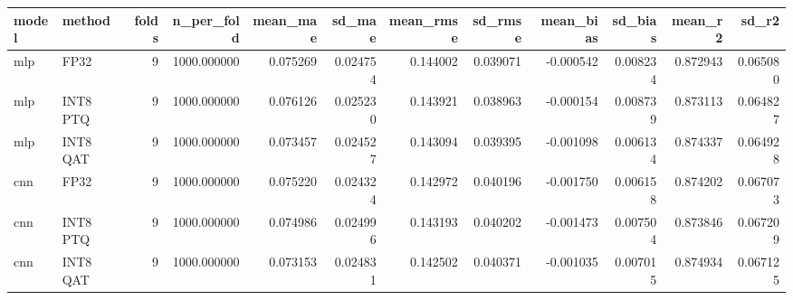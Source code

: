 \begin{tabular}{llrrrrrrrrrr}
\toprule
model & method & folds & n\_per\_fold & mean\_mae & sd\_mae & mean\_rmse & sd\_rmse & mean\_bias & sd\_bias & mean\_r2 & sd\_r2 \\
\midrule
mlp & FP32 & 9 & 1000.000000 & 0.075269 & 0.024754 & 0.144002 & 0.039071 & -0.000542 & 0.008234 & 0.872943 & 0.065080 \\
mlp & INT8 PTQ & 9 & 1000.000000 & 0.076126 & 0.025230 & 0.143921 & 0.038963 & -0.000154 & 0.008739 & 0.873113 & 0.064827 \\
mlp & INT8 QAT & 9 & 1000.000000 & 0.073457 & 0.024527 & 0.143094 & 0.039395 & -0.001098 & 0.006134 & 0.874337 & 0.064928 \\
cnn & FP32 & 9 & 1000.000000 & 0.075220 & 0.024324 & 0.142972 & 0.040196 & -0.001750 & 0.006158 & 0.874202 & 0.067073 \\
cnn & INT8 PTQ & 9 & 1000.000000 & 0.074986 & 0.024996 & 0.143193 & 0.040202 & -0.001473 & 0.007504 & 0.873846 & 0.067209 \\
cnn & INT8 QAT & 9 & 1000.000000 & 0.073153 & 0.024831 & 0.142502 & 0.040371 & -0.001035 & 0.007015 & 0.874934 & 0.067125 \\
\bottomrule
\end{tabular}
